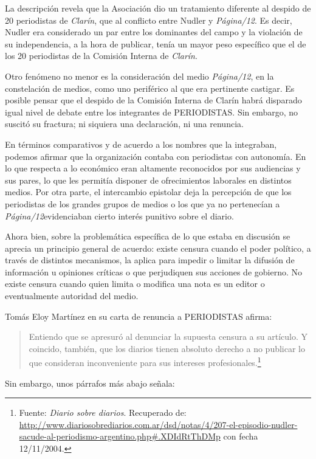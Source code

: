 La descripción revela que la Asociación dio un tratamiento diferente al despido de 20 periodistas de \emph{Clarín}, que al conflicto entre Nudler y \emph{Página/12}. Es decir, Nudler era considerado un par entre los dominantes del campo y la violación de su independencia, a la hora de publicar, tenía un mayor peso específico que el de los 20 periodistas de la Comisión Interna de \emph{Clarín}.

Otro fenómeno no menor es la consideración del medio \emph{Página/12}, en la constelación de medios, como uno periférico al que era pertinente castigar. Es posible pensar que el despido de la Comisión Interna de Clarín habrá disparado igual nivel de debate entre los integrantes de PERIODISTAS. Sin embargo, no suscitó su fractura; ni siquiera una declaración, ni una renuncia.

En términos comparativos y de acuerdo a los nombres que la integraban, podemos afirmar que la organización contaba con periodistas con autonomía. En lo que respecta a lo económico eran altamente reconocidos por sus audiencias y sus pares, lo que les permitía disponer de ofrecimientos laborales en distintos medios. Por otra parte, el intercambio epistolar deja la percepción de que los periodistas de los grandes grupos de medios o los que ya no pertenecían a \emph{Página/12}evidenciaban cierto interés punitivo sobre el diario.

Ahora bien, sobre la problemática específica de lo que estaba en discusión se aprecia un principio general de acuerdo: existe censura cuando el poder político, a través de distintos mecanismos, la aplica para impedir o limitar la difusión de información u opiniones críticas o que perjudiquen sus acciones de gobierno. No existe censura cuando quien limita o modifica una nota es un editor o eventualmente autoridad del medio.

Tomás Eloy Martínez en su carta de renuncia a PERIODISTAS afirma:

\begin{quote}
Entiendo que se apresuró al denunciar la supuesta censura a su artículo. Y coincido, también, que los diarios tienen absoluto derecho a no publicar lo que consideran inconveniente para sus intereses profesionales.\footnote{Fuente: \emph{Diario sobre diarios}. Recuperado de: \url{http://www.diariosobrediarios.com.ar/dsd/notas/4/207-el-episodio-nudler-sacude-al-periodismo-argentino.php\#.XDIdRtThDMp} con fecha 12/11/2004.}
\end{quote}

Sin embargo, unos párrafos más abajo señala:

